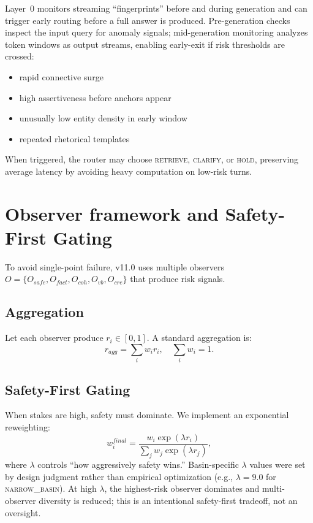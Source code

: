 \documentclass[11pt,a4paper]{article}
\begin{document}
Layer~0 monitors streaming ``fingerprints'' before and during generation and can
trigger early routing before a full answer is produced.
Pre-generation checks inspect the input query for anomaly signals; mid-generation
monitoring analyzes token windows as output streams, enabling early-exit if risk
thresholds are crossed:
\begin{itemize}
\item rapid connective surge
\item high assertiveness before anchors appear
\item unusually low entity density in early window
\item repeated rhetorical templates
\end{itemize}
When triggered, the router may choose \textsc{retrieve}, \textsc{clarify}, or
\textsc{hold}, preserving average latency by avoiding heavy computation on low-risk turns.

\section{Observer framework and Safety-First Gating}

To avoid single-point failure, v11.0 uses multiple observers
$O = \{O_{safe}, O_{fact}, O_{coh}, O_{vb}, O_{cre}\}$ that produce risk signals.

\subsection{Aggregation}
Let each observer produce $r_i \in [0,1]$. A standard aggregation is:
\begin{equation}
r_{agg} = \sum_i w_i r_i, \quad \sum_i w_i = 1.
\end{equation}

\subsection{Safety-First Gating}
When stakes are high, safety must dominate. We implement an exponential reweighting:
\begin{equation}
w_i^{final} = \frac{w_i \exp(\lambda r_i)}{\sum_j w_j \exp(\lambda r_j)},
\end{equation}
where $\lambda$ controls ``how aggressively safety wins.''
Basin-specific $\lambda$ values were set by design judgment rather than empirical
optimization (e.g., $\lambda = 9.0$ for \textsc{narrow\_basin}).
At high $\lambda$, the highest-risk observer dominates and multi-observer diversity
is reduced; this is an intentional safety-first tradeoff, not an oversight.
\end{document}
